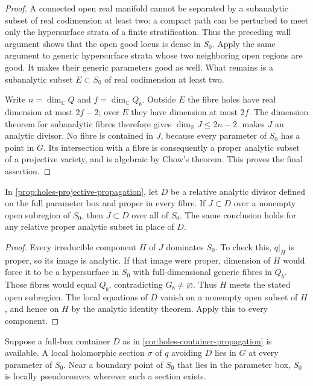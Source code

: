 \begin{proof}
A connected open real manifold cannot be separated by a subanalytic subset of real codimension at least two: a compact path can be perturbed to meet only the hypersurface strata of a finite stratification. Thus the preceding wall argument shows that the open good locus is dense in $S_0$. Apply the same argument to generic hypersurface strata whose two neighboring open regions are good. It makes their generic parameters good as well. What remains is a subanalytic subset $E\subset S_0$ of real codimension at least two.

Write $n=\dim_{\mathbb{C}}Q$ and $f=\dim_{\mathbb{C}}Q_b$. Outside $E$ the fibre holes have real dimension at most $2f-2$; over $E$ they have dimension at most $2f$. The dimension theorem for subanalytic fibres therefore gives $\dim_{\mathbb{R}}J\leq2n-2$.  makes $J$ an analytic divisor. No fibre is contained in $J$, because every parameter of $S_0$ has a point in $G$. Its intersection with a fibre is consequently a proper analytic subset of a projective variety, and is algebraic by Chow's theorem. This proves the final assertion.
\end{proof}

\begin{corollary}
\label{cor:holes-container-propagation}
In \cref{prop:holes-projective-propagation}, let $D$ be a relative analytic divisor defined on the full parameter box and proper in every fibre. If $J\subset D$ over a nonempty open subregion of $S_0$, then $J\subset D$ over all of $S_0$. The same conclusion holds for any relative proper analytic subset in place of $D$.
\end{corollary}

\begin{proof}
Every irreducible component $H$ of $J$ dominates $S_0$. To check this, $q|_H$ is proper, so its image is analytic. If that image were proper, dimension of $H$ would force it to be a hypersurface in $S_0$ with full-dimensional generic fibres in $Q_b$. Those fibres would equal $Q_b$, contradicting $G_b\ne\varnothing$. Thus $H$ meets the stated open subregion. The local equations of $D$ vanish on a nonempty open subset of $H$, and hence on $H$ by the analytic identity theorem. Apply this to every component.
\end{proof}

\begin{corollary}
\label{cor:holes-section-test}
Suppose a full-box container $D$ as in \cref{cor:holes-container-propagation} is available. A local holomorphic section $\sigma$ of $q$ avoiding $D$ lies in $G$ at every parameter of $S_0$. Near a boundary point of $S_0$ that lies in the parameter box, $S_0$ is locally pseudoconvex wherever such a section exists.
\end{corollary}

